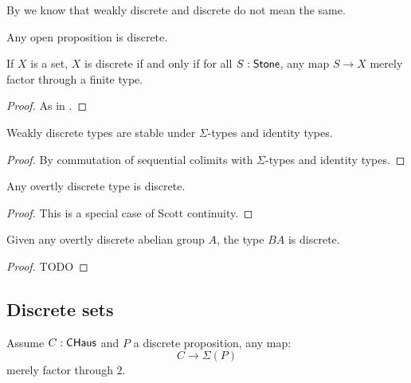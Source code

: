 By  we know that weakly discrete and discrete do not mean the same.

\begin{corollary}
Any open proposition is discrete.
\end{corollary}

\begin{lemma}\label{set-discrete}
If $X$ is a set, $X$ is discrete if and only if for all $S:\mathsf{Stone}$, any map $S\to X$ merely factor through a finite type.
\end{lemma}

\begin{proof}
As in .
\end{proof}

\begin{lemma}
Weakly discrete types are stable under $\Sigma$-types and identity types.
\end{lemma}

\begin{proof}
By commutation of sequential colimits with $\Sigma$-types and identity types.
\end{proof}

\begin{lemma}
Any overtly discrete type is discrete.
\end{lemma}

\begin{proof}
This is a special case of Scott continuity.
\end{proof}

\begin{lemma}
Given any overtly discrete abelian group $A$, the type $BA$ is discrete.
\end{lemma}

\begin{proof}
TODO 
\end{proof}


\subsection{Discrete sets}

\begin{lemma}
Assume $C:\mathsf{CHaus}$ and $P$ a discrete proposition, any map:
\[C\to \Sigma(P)\]
merely factor through $2$. 
\end{lemma}


